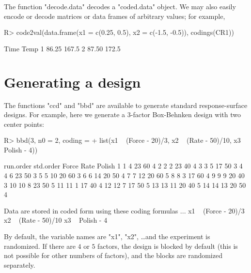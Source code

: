 \documentclass[article,nojss]{jss}
\begin{document}


The function "decode.data" decodes a "coded.data" object.  We may also easily encode or decode matrices or data frames of arbitrary values; for example,
\begin{Schunk}
\begin{Sinput}
R> code2val(data.frame(x1 = c(0.25, 0.5), x2 = c(-1.5, -0.5)), codings(CR1))
\end{Sinput}
\begin{Soutput}
   Time  Temp
1 86.25 167.5
2 87.50 172.5
\end{Soutput}
\end{Schunk}


\section{Generating a design}\label{designs}
The functions "ccd" and "bbd" are available to generate standard response-surface designs.  For example, here
we generate a 3-factor Box-Behnken design \cite[]{Box60} with two center points:
\begin{Schunk}
\begin{Sinput}
R> bbd(3, n0 = 2, coding =
+   list(x1 ~ (Force - 20)/3, x2 ~ (Rate - 50)/10, x3 ~ Polish - 4))
\end{Sinput}
\begin{Soutput}
   run.order std.order Force Rate Polish
1          1         4    23   60      4
2          2         2    23   40      4
3          3         5    17   50      3
4          4         6    23   50      3
5          5        10    20   60      3
6          6        14    20   50      4
7          7        12    20   60      5
8          8         3    17   60      4
9          9         9    20   40      3
10        10         8    23   50      5
11        11         1    17   40      4
12        12         7    17   50      5
13        13        11    20   40      5
14        14        13    20   50      4

Data are stored in coded form using these coding formulas ...
x1 ~ (Force - 20)/3
x2 ~ (Rate - 50)/10
x3 ~ Polish - 4
\end{Soutput}
\end{Schunk}
By default, the variable names are "x1", "x2", \ldots and the experiment is randomized.  If there are $4$ or $5$ factors, the design is blocked by default (this is not possible for other numbers of factors), and the blocks are randomized separately.
\end{document}

